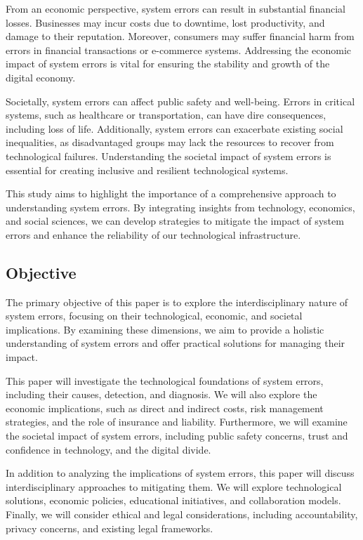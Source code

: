 \documentclass[10pt, conference, letterpaper]{IEEEtran}
\begin{document}
From an economic perspective, system errors can result in substantial financial losses. Businesses may incur costs due to downtime, lost productivity, and damage to their reputation. Moreover, consumers may suffer financial harm from errors in financial transactions or e-commerce systems. Addressing the economic impact of system errors is vital for ensuring the stability and growth of the digital economy.

Societally, system errors can affect public safety and well-being. Errors in critical systems, such as healthcare or transportation, can have dire consequences, including loss of life. Additionally, system errors can exacerbate existing social inequalities, as disadvantaged groups may lack the resources to recover from technological failures. Understanding the societal impact of system errors is essential for creating inclusive and resilient technological systems.

This study aims to highlight the importance of a comprehensive approach to understanding system errors. By integrating insights from technology, economics, and social sciences, we can develop strategies to mitigate the impact of system errors and enhance the reliability of our technological infrastructure.

\subsection{Objective}
The primary objective of this paper is to explore the interdisciplinary nature of system errors, focusing on their technological, economic, and societal implications. By examining these dimensions, we aim to provide a holistic understanding of system errors and offer practical solutions for managing their impact.

This paper will investigate the technological foundations of system errors, including their causes, detection, and diagnosis. We will also explore the economic implications, such as direct and indirect costs, risk management strategies, and the role of insurance and liability. Furthermore, we will examine the societal impact of system errors, including public safety concerns, trust and confidence in technology, and the digital divide.

In addition to analyzing the implications of system errors, this paper will discuss interdisciplinary approaches to mitigating them. We will explore technological solutions, economic policies, educational initiatives, and collaboration models. Finally, we will consider ethical and legal considerations, including accountability, privacy concerns, and existing legal frameworks.
\end{document}
